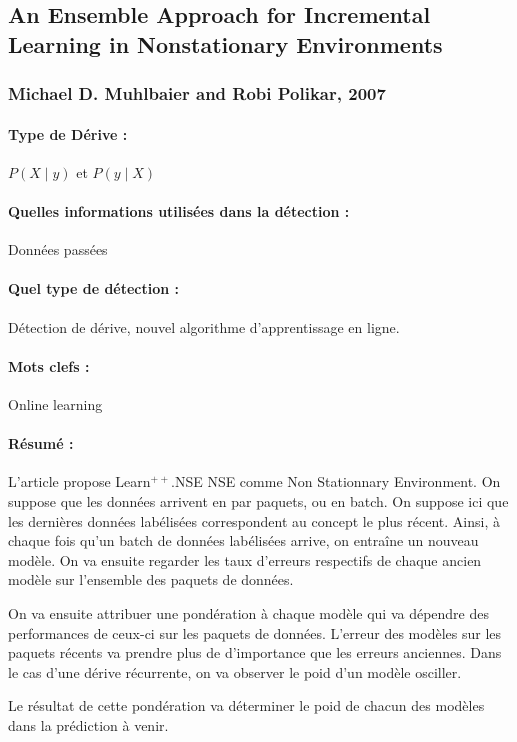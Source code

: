 \documentclass[11pt,a4paper]{report}
\begin{document}
\subsection{An Ensemble Approach for Incremental Learning in Nonstationary Environments}
\subsubsection{Michael D. Muhlbaier and Robi Polikar, 2007}

\paragraph{Type de Dérive :} $P(X\mid y)$ et $P(y \mid X)$
\paragraph{Quelles informations utilisées dans la détection :} Données passées
\paragraph{Quel type de détection :} Détection de dérive, nouvel algorithme d'apprentissage en ligne.

\paragraph{Mots clefs :} Online learning

\paragraph{Résumé :} L'article propose Learn$^{++}$.NSE NSE comme Non Stationnary Environment. On suppose que les données arrivent en par paquets, ou en batch. On suppose ici que les dernières données labélisées correspondent au concept le plus récent. Ainsi, à chaque fois qu'un batch de données labélisées arrive, on entraîne un nouveau modèle. On va ensuite regarder les taux d'erreurs respectifs de chaque ancien modèle sur l'ensemble des paquets de données. 

On va ensuite attribuer une pondération à chaque modèle qui va dépendre des performances de ceux-ci sur les paquets de données. L'erreur des modèles sur les paquets récents va prendre plus de d'importance que les erreurs anciennes. Dans le cas d'une dérive récurrente, on va observer le poid d'un modèle osciller.

Le résultat de cette pondération va déterminer le poid de chacun des modèles dans la prédiction à venir.
\end{document}
